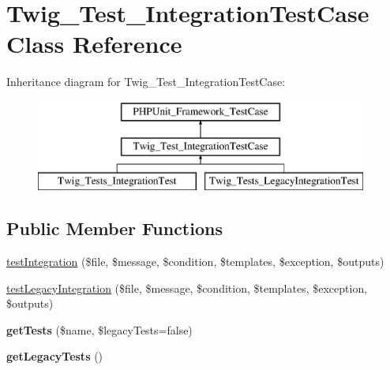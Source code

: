\hypertarget{classTwig__Test__IntegrationTestCase}{}\section{Twig\+\_\+\+Test\+\_\+\+Integration\+Test\+Case Class Reference}
\label{classTwig__Test__IntegrationTestCase}
Inheritance diagram for Twig\+\_\+\+Test\+\_\+\+Integration\+Test\+Case\+:\begin{figure}[H]
\begin{center}
\leavevmode
\includegraphics[height=3.000000cm]{classTwig__Test__IntegrationTestCase}
\end{center}
\end{figure}
\subsection*{Public Member Functions}
\begin{DoxyCompactItemize}
\item 
\hyperlink{classTwig__Test__IntegrationTestCase_a43af313b1204c2684368470ca35d5c0a}{test\+Integration} (\$file, \$message, \$condition, \$templates, \$exception, \$outputs)
\item 
\hyperlink{classTwig__Test__IntegrationTestCase_a1cf72f1dcd8577a633b8b6cb5f0ac7c9}{test\+Legacy\+Integration} (\$file, \$message, \$condition, \$templates, \$exception, \$outputs)
\item 
{\bfseries get\+Tests} (\$name, \$legacy\+Tests=false)\hypertarget{classTwig__Test__IntegrationTestCase_a6c9b4bc85a7ad2e55a7b92412e9c608f}{}\label{classTwig__Test__IntegrationTestCase_a6c9b4bc85a7ad2e55a7b92412e9c608f}

\item 
{\bfseries get\+Legacy\+Tests} ()\hypertarget{classTwig__Test__IntegrationTestCase_ab790af844b206566c5cfcd4aea1cf634}{}\label{classTwig__Test__IntegrationTestCase_ab790af844b206566c5cfcd4aea1cf634}

\end{DoxyCompactItemize}
